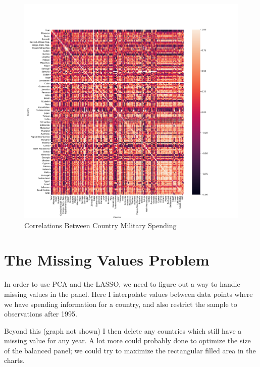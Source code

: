 \documentclass{report}
\begin{document}
	\begin{figure}[h!]
		\centering
		\caption{Correlations Between Country Military Spending}
		\label{Milex_Correlations}	
		\includegraphics[width=\linewidth,keepaspectratio=true]{../Output/Figures/Milex_Correlations.pdf}
	\end{figure}

    \section*{The Missing Values Problem}

    In order to use PCA and the LASSO, we need to figure out a way to handle missing values in the panel. Here I interpolate values between data points where we have spending information for a country, and also restrict the sample to observations after 1995.

	Beyond this (graph not shown) I then delete any countries which still have a missing value for any year. A lot more could probably done to optimize the size of the balanced panel; we could try to maximize the rectangular filled area in the charts.
\end{document}
